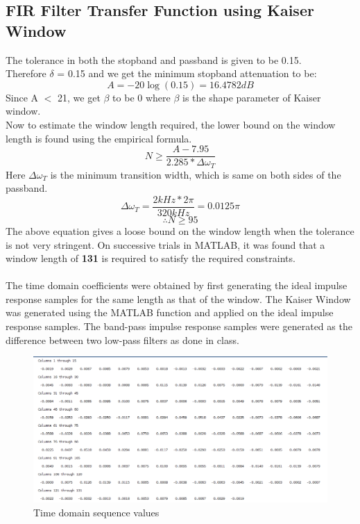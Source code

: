 \documentclass[12pt]{article}
\begin{document}
\subsection{FIR Filter Transfer Function using Kaiser Window}
The tolerance in both the stopband and passband is given to be 0.15.\\
Therefore $\delta$ = 0.15 and we get the  minimum stopband attenuation to be:
\begin{equation*}
A = -20\log (0.15) = 16.4782 dB
\end{equation*}
Since A $<$ 21, we get $\beta$ to be 0 where  $\beta$ is the shape parameter of Kaiser window.\\
Now to estimate the window length required, the lower bound on the window length is found using the empirical formula.
\begin{equation*}
N \geq \frac{A-7.95}{2.285*\Delta\omega _{T}}
\end{equation*}
Here $\Delta\omega _{T}$ is the minimum transition width, which is same on both sides of the passband.
\begin{equation*}
\Delta\omega _{T} = \frac{2 kHz * 2\pi}{320 kHz} =  0.0125\pi
\end{equation*}
\begin{equation*}
\therefore N \geq 95
\end{equation*}
The above equation gives a loose bound on the window length when the tolerance is not very stringent. On successive trials in MATLAB, it was found that a window length of \textbf{131} is required to satisfy the required constraints. \\
\\The time domain coefficients were obtained by first generating the ideal impulse response samples for the same length as that of the window. The Kaiser Window was generated using the MATLAB function and applied on the ideal impulse response samples. The band-pass impulse response samples were generated as the difference between two low-pass filters as done in class.
\newpage
\begin{figure}[h!]
	\centering
    \includegraphics[width = 1\textwidth]{1firt.png}
    \caption{Time domain sequence values}
\end{figure}
\end{document}
